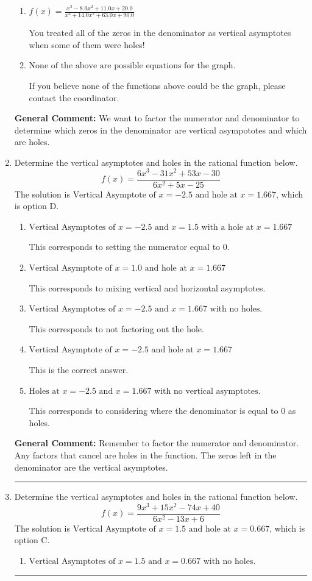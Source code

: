 \documentclass{extbook}[14pt]
\newcommand{\litem}[1]{\item #1

\rule{\textwidth}{0.4pt}}
\begin{document}
\begin{enumerate}
{\begin{enumerate}[label=\Alph*.]
Remember that factors are written as $x-z$. For example, the zero $x=-3$ corresponds to the factor $x-(-3)$.
\item \( f(x)=\frac{x^{3} -8.0 x^{2} +11.0 x + 20.0}{x^{3} +14.0 x^{2} +63.0 x + 90.0} \)

You treated all of the zeros in the denominator as vertical asymptotes when some of them were holes!
\item \( \text{None of the above are possible equations for the graph.} \)

If you believe none of the functions above could be the graph, please contact the coordinator.
\end{enumerate}

\textbf{General Comment:} We want to factor the numerator and denominator to determine which zeros in the denominator are vertical asympototes and which are holes.
}
\litem{
Determine the vertical asymptotes and holes in the rational function below.
\[ f(x) = \frac{6x^{3} -31 x^{2} +53 x -30}{6x^{2} +5 x -25} \]The solution is \( \text{Vertical Asymptote of } x = -2.5 \text{ and hole at } x = 1.667 \), which is option D.\begin{enumerate}[label=\Alph*.]
\item \( \text{Vertical Asymptotes of } x = -2.5 \text{ and } x = 1.5 \text{ with a hole at } x = 1.667 \)

This corresponds to setting the numerator equal to 0.
\item \( \text{Vertical Asymptote of } x = 1.0 \text{ and hole at } x = 1.667 \)

This corresponds to mixing vertical and horizontal asymptotes.
\item \( \text{Vertical Asymptotes of } x = -2.5 \text{ and } x = 1.667 \text{ with no holes.} \)

This corresponds to not factoring out the hole.
\item \( \text{Vertical Asymptote of } x = -2.5 \text{ and hole at } x = 1.667 \)

This is the correct answer.
\item \( \text{Holes at } x = -2.5 \text{ and } x = 1.667 \text{ with no vertical asymptotes.} \)

This corresponds to considering where the denominator is equal to 0 as holes.
\end{enumerate}

\textbf{General Comment:} Remember to factor the numerator and denominator. Any factors that cancel are holes in the function. The zeros left in the denominator are the vertical asymptotes.
}
\litem{
Determine the vertical asymptotes and holes in the rational function below.
\[ f(x) = \frac{9x^{3} +15 x^{2} -74 x + 40}{6x^{2} -13 x + 6} \]The solution is \( \text{Vertical Asymptote of } x = 1.5 \text{ and hole at } x = 0.667 \), which is option C.\begin{enumerate}[label=\Alph*.]
\item \( \text{Vertical Asymptotes of } x = 1.5 \text{ and } x = 0.667 \text{ with no holes.} \)


\end{enumerate}}
\end{enumerate}
\end{document}
